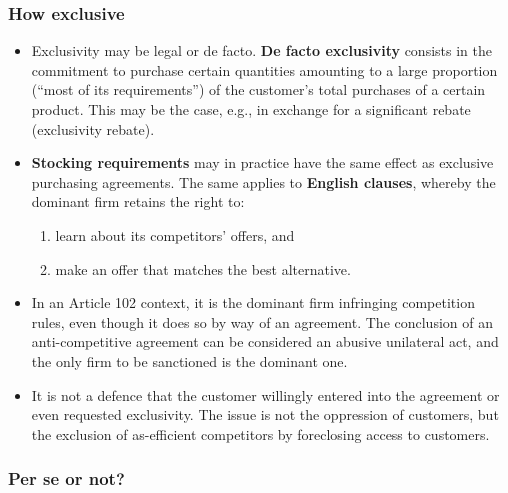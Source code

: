         \subsubsection{How exclusive}

            \begin{itemize}
                \item Exclusivity may be legal or de facto. \textbf{De facto exclusivity} consists in the commitment to purchase certain quantities amounting to a large proportion (“most of its requirements”) of the customer’s total purchases of a certain product. This may be the case, e.g., in exchange for a significant rebate (exclusivity rebate).
                \item \textbf{Stocking requirements} may in practice have the same effect as exclusive purchasing agreements. The same applies to \textbf{English clauses}, whereby the dominant firm retains the right to: 
                \begin{enumerate}
                    \item learn about its competitors’ offers, and
                    \item make an offer that matches the best alternative.
                \end{enumerate}
                \item In an Article 102 context, it is the dominant firm infringing competition rules, even though it does so by way of an agreement. The conclusion of an anti-competitive agreement can be considered an abusive unilateral act, and the only firm to be sanctioned is the dominant one.
                \item It is not a defence that the customer willingly entered into the agreement or even requested exclusivity. The issue is not the oppression of customers, but the exclusion of as-efficient competitors by foreclosing access to customers.
            \end{itemize}

        \subsubsection{Per se or not?}

